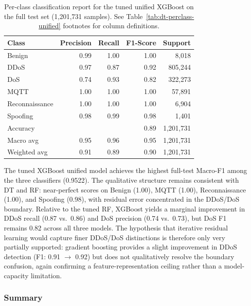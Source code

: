 \begin{table}[H]
\centering
\caption{Per-class classification report for the tuned unified XGBoost on the full test set (1,201,731 samples). See Table~\ref{tab:dt-perclass-unified} footnotes for column definitions.}
\label{tab:xgb-perclass-unified}
\small
\begin{tabular}{@{}l r r r r@{}}
\toprule
\textbf{Class} & \textbf{Precision} & \textbf{Recall} & \textbf{F1-Score} & \textbf{Support} \\
\midrule
Benign          & 0.99 & 1.00 & 1.00 &     8,018 \\
DDoS            & 0.97 & 0.87 & 0.92 &   805,244 \\
DoS             & 0.74 & 0.93 & 0.82 &   322,273 \\
MQTT            & 1.00 & 1.00 & 1.00 &    57,891 \\
Reconnaissance  & 1.00 & 1.00 & 1.00 &     6,904 \\
Spoofing        & 0.98 & 0.99 & 0.98 &     1,401 \\
\midrule
Accuracy        &      &      & 0.89 & 1,201,731 \\
Macro avg       & 0.95 & 0.96 & 0.95 & 1,201,731 \\
Weighted avg    & 0.91 & 0.89 & 0.90 & 1,201,731 \\
\bottomrule
\end{tabular}
\end{table}

The tuned XGBoost unified model achieves the highest full-test Macro-F1 among the three classifiers (0.9522). The qualitative structure remains consistent with DT and RF: near-perfect scores on Benign (1.00), MQTT (1.00), Reconnaissance (1.00), and Spoofing (0.98), with residual error concentrated in the DDoS/DoS boundary. Relative to the tuned RF, XGBoost yields a marginal improvement in DDoS recall (0.87 vs.\ 0.86) and DoS precision (0.74 vs.\ 0.73), but DoS F1 remains 0.82 across all three models. The hypothesis that iterative residual learning would capture finer DDoS/DoS distinctions is therefore only very partially supported: gradient boosting provides a slight improvement in DDoS detection (F1: 0.91 $\to$ 0.92) but does not qualitatively resolve the boundary confusion, again confirming a feature-representation ceiling rather than a model-capacity limitation.

\subsubsection{Summary}

